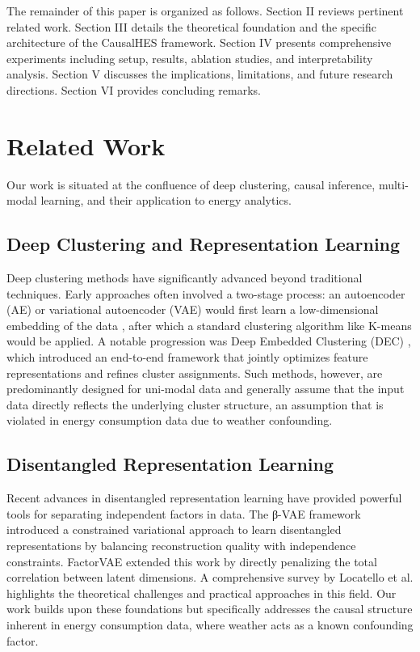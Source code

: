 \documentclass[journal]{IEEEtran}
\begin{document}
The remainder of this paper is organized as follows. Section II reviews pertinent related work. Section III details the theoretical foundation and the specific architecture of the CausalHES framework. Section IV presents comprehensive experiments including setup, results, ablation studies, and interpretability analysis. Section V discusses the implications, limitations, and future research directions. Section VI provides concluding remarks.


\section{Related Work}
Our work is situated at the confluence of deep clustering, causal inference, multi-modal learning, and their application to energy analytics.

\subsection{Deep Clustering and Representation Learning}
Deep clustering methods have significantly advanced beyond traditional techniques. Early approaches often involved a two-stage process: an autoencoder (AE) or variational autoencoder (VAE) would first learn a low-dimensional embedding of the data \cite{autoencoder_representation_learning}, after which a standard clustering algorithm like K-means would be applied. A notable progression was Deep Embedded Clustering (DEC) \cite{deep_embedding_clustering_xie}, which introduced an end-to-end framework that jointly optimizes feature representations and refines cluster assignments. Such methods, however, are predominantly designed for uni-modal data and generally assume that the input data directly reflects the underlying cluster structure, an assumption that is violated in energy consumption data due to weather confounding.

\subsection{Disentangled Representation Learning}
Recent advances in disentangled representation learning have provided powerful tools for separating independent factors in data. The β-VAE framework \cite{beta_vae} introduced a constrained variational approach to learn disentangled representations by balancing reconstruction quality with independence constraints. FactorVAE \cite{factor_vae} extended this work by directly penalizing the total correlation between latent dimensions. A comprehensive survey by Locatello et al. \cite{disentangled_survey} highlights the theoretical challenges and practical approaches in this field. Our work builds upon these foundations but specifically addresses the causal structure inherent in energy consumption data, where weather acts as a known confounding factor.
\end{document}
